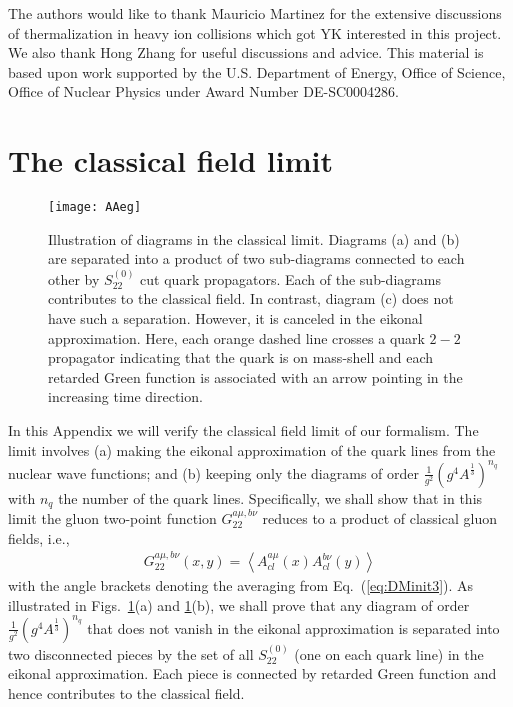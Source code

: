 \documentclass[onecolumn,showpacs,nobibnotes,nofootinbib,12pt,aps,prd,showpacs,notitlepage,nofootinbib,preprintnumbers,amsmath,amssymb]{article}
\def\eq#1{{Eq.~(\ref{#1})}}
\begin{document}

\acknowledgments

The authors would like to thank Mauricio Martinez for the extensive
discussions of thermalization in heavy ion collisions which got YK
interested in this project. We also thank Hong Zhang for useful
discussions and advice.  This material is based upon work supported by
the U.S. Department of Energy, Office of Science, Office of Nuclear
Physics under Award Number DE-SC0004286.



\appendix


\section{The classical field limit}
\label{sec:class}

\begin{figure}[tbp]
\begin{center}
\texttt{[image: AAeg]}
\end{center}
\caption[*]{Illustration of diagrams in the classical limit. Diagrams
  (a) and (b) are separated into a product of two sub-diagrams
  connected to each other by $S^{(0)}_{22}$ cut quark
  propagators. Each of the sub-diagrams contributes to the classical
  field. In contrast, diagram (c) does not have such a
  separation. However, it is canceled in the eikonal
  approximation. Here, each orange dashed line crosses a quark $2-2$
  propagator indicating that the quark is on mass-shell and each
  retarded Green function is associated with an arrow pointing in the
  increasing time direction.}
\label{fig:AAeg}
\end{figure}


In this Appendix we will verify the classical field limit of our
formalism. The limit involves (a) making the eikonal approximation of
the quark lines from the nuclear wave functions; and (b) keeping only
the diagrams of order $\frac{1}{g^2} (g^4 A^{\frac{1}{3}})^{n_q}$ with
$n_q$ the number of the quark lines. Specifically, we shall show that
in this limit the gluon two-point function $G_{22}^{a\mu,b\nu}$
reduces to a product of classical gluon fields, i.e.,
\begin{align}
  G^{a\mu,b\nu}_{22}(x,y)=\left< A_{cl}^{a\mu}(x) A_{cl}^{b\nu}(y)
  \right>
  \label{eq:GclassLimit}
\end{align}
with the angle brackets denoting the averaging from \eq{eq:DMinit3}.
As illustrated in Figs.~\ref{fig:AAeg}(a) and \ref{fig:AAeg}(b), we
shall prove that any diagram of order $\frac{1}{g^2} (g^4
A^{\frac{1}{3}})^{n_q}$ that does not vanish in the eikonal
approximation is separated into two disconnected pieces by the set of
all $S^{(0)}_{22}$ (one on each quark line) in the eikonal
approximation. Each piece is connected by retarded Green function and
hence contributes to the classical field.
\end{document}
